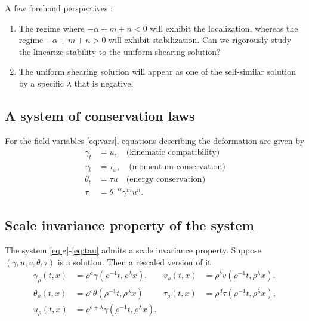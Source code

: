 \documentclass[a4paper,11pt]{article}
\def\blue{\color{blue}}
\begin{document}
A few forehand perspectives :
\begin{enumerate}
 \item The regime where $-\alpha+m+n <0$ will exhibit the localization, whereas the regime $-\alpha+m+n > 0$ will exhibit stabilization. {\blue Can we rigorously study the linearize stability to the uniform shearing solution?}
 \item The uniform shearing solution will appear as one of the self-similar solution by a specific $\lambda$ that is negative.
\end{enumerate}
\subsection{A system of conservation laws}
For the field variables \eqref{eq:vars}, equations describing the deformation are given by
\begin{align}
 \gamma_t &= u, \quad \text{(kinematic compatibility)} 	\label{eq:g}\\
 v_t &= \tau_x, \quad \text{(momentum conservation)} 	\label{eq:v}\\
 \theta_t &= \tau u \quad \text{(energy conservation)}	\label{eq:th}\\
 \tau &=\theta^{-\alpha}\gamma^m u^n.			\label{eq:tau}
\end{align}
\subsection{Scale invariance property of the system}
The system \eqref{eq:g}-\eqref{eq:tau} admits a scale invariance property. Suppose $(\gamma,u,v,\theta,\tau)$ is a solution. Then a rescaled version of it 
\begin{align*}
 \gamma_\rho(t,x) &= \rho^a\gamma(\rho^{-1}t,\rho^\lambda x), &
 v_\rho(t,x) &= \rho^bv(\rho^{-1}t,\rho^\lambda x),\\
 \theta_\rho(t,x) &= \rho^c\theta(\rho^{-1}t,\rho^\lambda x) &
 \tau_\rho(t,x) &= \rho^d\tau(\rho^{-1}t,\rho^\lambda x),\\
 u_\rho(t,x) &= \rho^{b+\lambda}\gamma(\rho^{-1}t,\rho^\lambda x). 
\end{align*}
\end{document}
